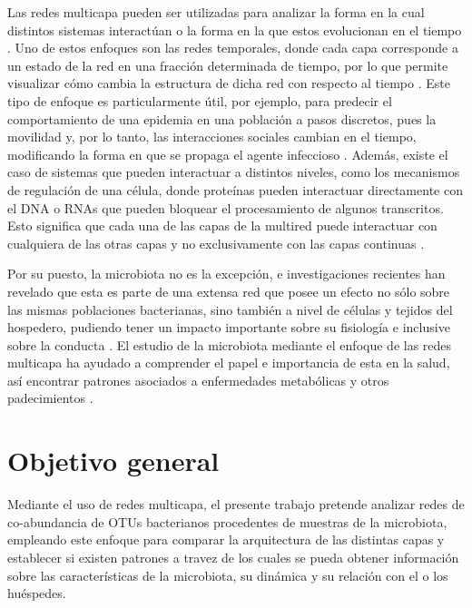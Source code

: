 \documentclass[
]{book}
\begin{document}
Las redes multicapa pueden ser utilizadas para analizar la forma en la cual distintos sistemas interactúan o la forma en la que estos evolucionan en el tiempo \citep{bianconi2018multilayer}. Uno de estos enfoques son las redes temporales, donde cada capa corresponde a un estado de la red en una fracción determinada de tiempo, por lo que permite visualizar cómo cambia la estructura de dicha red con respecto al tiempo \citep{bianconi2018multilayer}. Este tipo de enfoque es particularmente útil, por ejemplo, para predecir el comportamiento de una epidemia en una población a pasos discretos, pues la movilidad y, por lo tanto, las interacciones sociales cambian en el tiempo, modificando la forma en que se propaga el agente infeccioso \citep{zuzek2015epidemic}. Además, existe el caso de sistemas que pueden interactuar a distintos niveles, como los mecanismos de regulación de una célula, donde proteínas pueden interactuar directamente con el DNA o RNAs que pueden bloquear el procesamiento de algunos transcritos. Esto significa que cada una de las capas de la multired puede interactuar con cualquiera de las otras capas y no exclusivamente con las capas continuas \citep{aleta2019multilayer}.

Por su puesto, la microbiota no es la excepción, e investigaciones recientes han revelado que esta es parte de una extensa red que posee un efecto no sólo sobre las mismas poblaciones bacterianas, sino también a nivel de células y tejidos del hospedero, pudiendo tener un impacto importante sobre su fisiología e inclusive sobre la conducta \citep{albert2002statistical}. El estudio de la microbiota mediante el enfoque de las redes multicapa ha ayudado a comprender el papel e importancia de esta en la salud, así encontrar patrones asociados a enfermedades metabólicas y otros padecimientos \citep{albert2002statistical}.

\hypertarget{objetivo-general}{%
\section*{Objetivo general}\label{objetivo-general}}

Mediante el uso de redes multicapa, el presente trabajo pretende analizar redes de co-abundancia de OTUs bacterianos procedentes de muestras de la microbiota, empleando este enfoque para comparar la arquitectura de las distintas capas y establecer si existen patrones a travez de los cuales se pueda obtener información sobre las características de la microbiota, su dinámica y su relación con el o los huéspedes.
\end{document}
